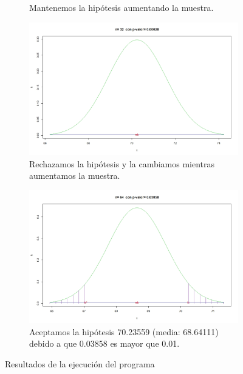 \begin{figure}[h]
\begin{subfigure}{0.499\textwidth}
		\caption{Mantenemos la hipótesis aumentando la muestra.}
		\label{fig:subim7}
	\end{subfigure}
	\begin{subfigure}{0.499\textwidth}
		\includegraphics[width=\linewidth]{assets/ejemplo-32.jpeg}
		\caption{Rechazamos la hipótesis y la cambiamos mientras aumentamos la muestra.}
		\label{fig:subim8}
	\end{subfigure}
	\begin{subfigure}{0.499\textwidth}
		\includegraphics[width=\linewidth]{assets/ejemplo-64.jpeg}
		\caption{Aceptamos la hipótesis 70.23559 (media: 68.64111) debido a que  0.03858 es mayor que 0.01.}
		\label{fig:subim9}
	\end{subfigure}
	\caption{Resultados de la ejecución del programa}
	\label{fig:image3}
\end{figure}
